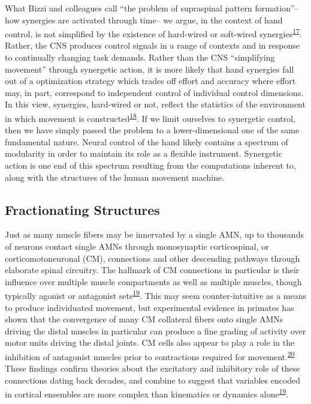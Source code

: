 \documentclass[
  a4paper,
]{article}
\begin{document}
What Bizzi and colleagues call ``the problem of supraspinal pattern
formation''--how synergies are activated through time-- we argue, in the
context of hand control, is not simplified by the existence of
hard-wired or soft-wired
synergies\textsuperscript{\protect\hyperlink{ref-bizziMotorPlanningExecution2020}{17}}.
Rather, the CNS produces control signals in a range of contexts and in
response to continually changing task demands. Rather than the CNS
``simplifying movement'' through synergetic action, it is more likely
that hand synergies fall out of a optimization strategy which trades off
effort and accuracy where effort may, in part, correspond to independent
control of individual control dimensions. In this view, synergies,
hard-wired or not, reflect the statistics of the environment in which
movement is
constructed\textsuperscript{\protect\hyperlink{ref-brutonSynergiesCoordinationComprehensive2018}{18}}.
If we limit ourselves to synergetic control, then we have simply passed
the problem to a lower-dimensional one of the same fundamental nature.
Neural control of the hand likely contains a spectrum of modularity in
order to maintain its role as a flexible instrument. Synergetic action
is one end of this spectrum resulting from the computations inherent to,
along with the structures of the human movement machine.

\hypertarget{fractionating-structures}{%
\subsection{Fractionating Structures}\label{fractionating-structures}}

Just as many muscle fibers may be innervated by a single AMN, up to
thousands of neurons contact single AMNs through monosynaptic
corticospinal, or corticomotoneuronal (CM), connections and other
descending pathways through elaborate spinal circuitry. The hallmark of
CM connections in particular is their influence over multiple muscle
compartments as well as multiple muscles, though typically agonist or
antagonist
sets\textsuperscript{\protect\hyperlink{ref-cheneyFunctionalClassesPrimate1980}{19}}.
This may seem counter-intuitive as a means to produce individuated
movement, but experimental evidence in primates has shown that the
convergence of many CM collateral fibers onto single AMNs driving the
distal muscles in particular can produce a fine grading of activity over
motor units driving the distal joints. CM cells also appear to play a
role in the inhibition of antagonist muscles prior to contractions
required for
movement.\textsuperscript{\protect\hyperlink{ref-griffinMotorCortexUses2020}{20}}
These findings confirm theories about the excitatory and inhibitory role
of these connections dating back decades, and combine to suggest that
variables encoded in cortical ensembles are more complex than kinematics
or dynamics
alone\textsuperscript{\protect\hyperlink{ref-cheneyFunctionalClassesPrimate1980}{19}}.
\end{document}

